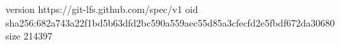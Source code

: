 version https://git-lfs.github.com/spec/v1
oid sha256:682a743a22f1bd5b63dfd2bc590a559aec55d85a3cfecfd2e5fbdf672da30680
size 214397
